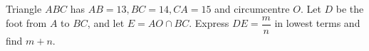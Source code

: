 Triangle $ABC$ has $AB=13,BC=14,CA=15$ and circumcentre $O$. Let $D$ be the foot from $A$ to $BC$, and let $E=AO\cap BC$. Express $DE=\dfrac{m}{n}$ in lowest terms and find $m+n$.
